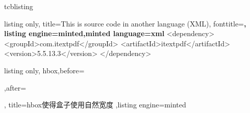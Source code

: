 \begin{docEnvironment}{tcblisting}{}
\begin{dispExample}
\begin{tcblisting}{listing only,
title=This is source code in another language (XML), fonttitle=\bfseries,
listing engine=minted,minted language=xml}
<dependency>
  <groupId>com.itextpdf</groupId>
  <artifactId>itextpdf</artifactId>
  <version>5.5.13.3</version>
</dependency>
\end{tcblisting}
\end{dispExample}





\begin{dispExample}
\begin{tcblisting}{listing only,
hbox,before=\begin{center},after=\end{center},
title={hbox使得盒子使用自然宽度}
,listing engine=minted}
\end{tcblisting}
\end{dispExample}
\end{docEnvironment}